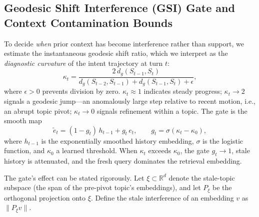 \documentclass[11pt]{article}
\begin{document}
\subsection{Geodesic Shift Interference (GSI) Gate and Context Contamination Bounds}
\label{sec:gsigate}

To decide \emph{when} prior context has become interference rather than support, we estimate the instantaneous geodesic shift ratio, which we interpret as the \emph{diagnostic curvature} of the intent trajectory at turn $t$:
\begin{equation}
\kappa_t = \frac{2\,d_g(S_{t-1},S_t)}{d_g(S_{t-2},S_{t-1}) + d_g(S_{t-1},S_t) + \epsilon},
\label{eq:gsr}
\end{equation}
where $\epsilon>0$ prevents division by zero. $\kappa_t\approx 1$ indicates steady progress; $\kappa_t \to 2$ signals a geodesic jump---an anomalously large step relative to recent motion, i.e., an abrupt topic pivot; $\kappa_t \to 0$ signals refinement within a topic. The gate is the smooth map
\begin{equation}
\tilde{e}_t = (1-g_t)\,h_{t-1} + g_t\,e_t, \qquad g_t = \sigma(\kappa_t-\kappa_0),
\label{eq:gate}
\end{equation}
where $h_{t-1}$ is the exponentially smoothed history embedding, $\sigma$ is the logistic function, and $\kappa_0$ a learned threshold. When $\kappa_t$ exceeds $\kappa_0$, the gate $g_t\to 1$, stale history is attenuated, and the fresh query dominates the retrieval embedding.

The gate's effect can be stated rigorously. Let $\xi\subset\mathbb{R}^d$ denote the stale-topic subspace (the span of the pre-pivot topic's embeddings), and let $P_\xi$ be the orthogonal projection onto $\xi$. Define the stale interference of an embedding $v$ as $\|P_\xi v\|$.
\end{document}
